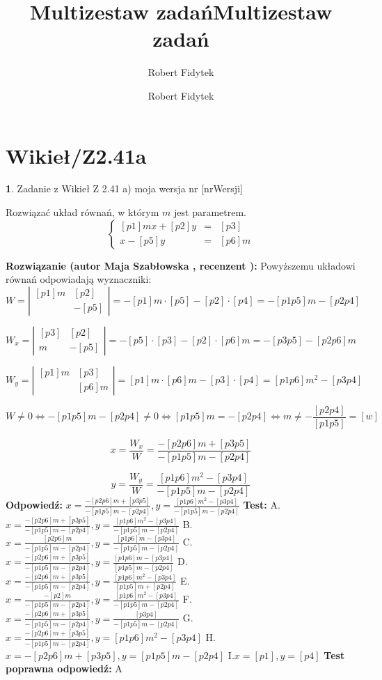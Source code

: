 \documentclass[12pt, a4paper]{article}
\title{Multizestaw zadań}
\author{Robert Fidytek}
\date{}\documentclass[12pt, a4paper]{article}
\title{Multizestaw zadań}
\author{Robert Fidytek}
\date{}
\theoremstyle{definition} %
\newtheorem{zad}{}
\theoremstyle{definition} %
\newtheorem{zad}{}
\newcommand{\kategoria}[1]{\section{#1}} %
\newcommand{\zadStart}[1]{\begin{zad}#1\newline} %
\newcommand{\zadStop}{\end{zad}}   %
\newcommand{\rozwStart}[2]{\noindent \textbf{Rozwiązanie (autor #1 , recenzent #2): }\newline} %
\newcommand{\rozwStop}{\newline}                                            %
\newcommand{\odpStart}{\noindent \textbf{Odpowiedź:}\newline}    %
\newcommand{\odpStop}{\newline}                                             %
\newcommand{\testStart}{\noindent \textbf{Test:}\newline} %
\newcommand{\testStop}{\newline} %
\newcommand{\kluczStart}{\noindent \textbf{Test poprawna odpowiedź:}\newline} %
\newcommand{\kluczStop}{\newline} %
\begin{document}
\maketitle


\kategoria{Wikieł/Z2.41a}
\zadStart{Zadanie z Wikieł Z 2.41 a)  moja wersja nr [nrWersji]}

Rozwiązać układ równań, w którym $m$ jest parametrem.
$$\left\{\begin{array}{ccc}
[p1]mx+[p2]y&=&[p3]\\
[p4]x-[p5]y&=&[p6]m
\end{array} \right.$$

\zadStop
\rozwStart{Maja Szabłowska}{}
Powyższemu układowi równań odpowiadają wyznaczniki:
$$W=\left| \begin{array}{lccr} [p1]m & [p2] \\ [p4] & -[p5] \end{array}\right| = -[p1]m\cdot[p5] - [p2]\cdot[p4]=-[p1p5]m-[p2p4]$$

$$W_{x}=\left| \begin{array}{lccr} [p3] & [p2] \\ [p6]m & -[p5] \end{array}\right| = -[p5]\cdot[p3] - [p2]\cdot[p6]m=-[p3p5]-[p2p6]m$$

$$W_{y}=\left| \begin{array}{lccr} [p1]m & [p3] \\ [p4] & [p6]m \end{array}\right| = [p1]m\cdot[p6]m - [p3]\cdot[p4]=[p1p6]m^{2}-[p3p4]$$

$$W\neq 0 \iff -[p1p5]m-[p2p4]\neq 0 \iff [p1p5]m=-[p2p4] \iff m\neq -\frac{[p2p4]}{[p1p5]}=[w]$$

$$x=\frac{W_{x}}{W}=\frac{-[p2p6]m+[p3p5]}{-[p1p5]m-[p2p4]}$$

$$y=\frac{W_{y}}{W}=\frac{[p1p6]m^{2}-[p3p4]}{-[p1p5]m-[p2p4]}$$
\rozwStop
\odpStart
$x=\frac{-[p2p6]m+[p3p5]}{-[p1p5]m-[p2p4]}, y=\frac{[p1p6]m^{2}-[p3p4]}{-[p1p5]m-[p2p4]}$
\odpStop
\testStart
A.$x=\frac{-[p2p6]m+[p3p5]}{-[p1p5]m-[p2p4]}, y=\frac{[p1p6]m^{2}-[p3p4]}{-[p1p5]m-[p2p4]}$
B.$x=\frac{[p2p6]m}{-[p1p5]m-[p2p4]}, y=\frac{[p1p6]m-[p3p4]}{-[p1p5]m-[p2p4]}$
C.$x=\frac{-[p2p6]m+[p3p5]}{-[p1p5]m-[p2p4]}, y=\frac{[p1p6]m-[p3p4]}{[p1p5]m-[p2p4]}$
D.$x=\frac{-[p2p6]m+[p3p5]}{-[p1p5]m-[p2p4]}, y=\frac{[p1p6]m^{2}-[p3p4]}{[p1p5]m+[p2p4]}$
E.$x=\frac{-[p2]m}{-[p1p5]m-[p2p4]}, y=\frac{[p1p6]m^{2}-[p3p4]}{-[p1p5]m-[p2p4]}$
F.$x=\frac{-[p2p6]m+[p3p5]}{-[p1p5]m-[p2p4]}, y=\frac{[p3p4]}{-[p1p5]m-[p2p4]}$
G.$x=\frac{-[p2p6]m+[p3p5]}{-[p1p5]m-[p2p4]}, y=[p1p6]m^{2}-[p3p4]$
H.$x=-[p2p6]m+[p3p5], y=[p1p5]m-[p2p4]$
I.$x=[p1], y=[p4]$
\testStop
\kluczStart
A
\kluczStop
\end{document}
